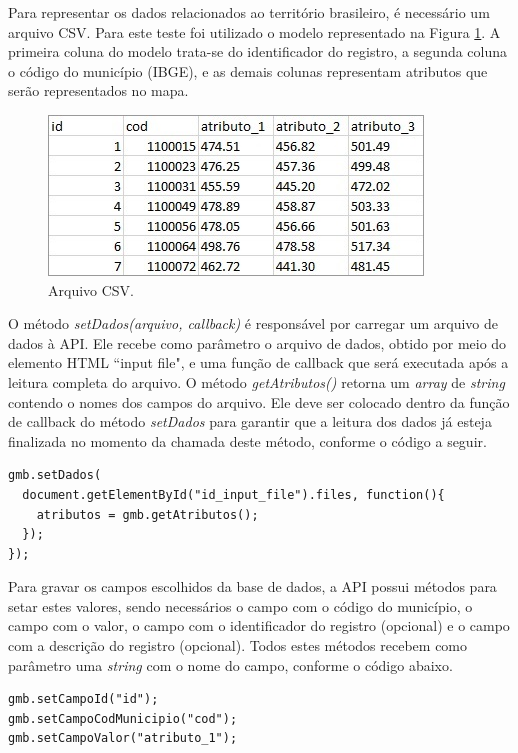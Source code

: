 \documentclass[12pt]{article}
\begin{document}
Para representar os dados relacionados ao território brasileiro, é necessário um arquivo CSV. Para este teste foi utilizado o modelo representado na Figura \ref{baseDados}. A primeira coluna do modelo trata-se do identificador do registro, a segunda coluna o código do município (IBGE), e as demais colunas representam atributos que serão representados no mapa.

\begin{figure}[!h]
\centering
\includegraphics[scale=1]{base-de-dados.jpg}
\caption{Arquivo CSV.}
\label{baseDados}
\end{figure}

O método \textit{setDados(arquivo, callback)} é responsável por carregar um arquivo de dados à API. Ele recebe como parâmetro o arquivo de dados, obtido por meio do elemento HTML ``input file", e uma função de callback que será executada após a leitura completa do arquivo. O método \textit{getAtributos()} retorna um \textit{array} de \textit{string} contendo o nomes dos campos do arquivo. Ele deve ser colocado dentro da função de callback do método \textit{setDados} para garantir que a leitura dos dados já esteja finalizada no momento da chamada deste método, conforme o código a seguir.

\begin{lstlisting}
gmb.setDados(
  document.getElementById("id_input_file").files, function(){
    atributos = gmb.getAtributos();
  });
});
\end{lstlisting}

Para gravar os campos escolhidos da base de dados, a API possui métodos para setar estes valores, sendo necessários o campo com o código do município, o campo com o valor, o campo com o identificador do registro (opcional) e o campo com a descrição do registro (opcional). Todos estes métodos recebem como parâmetro uma \textit{string} com o nome do campo, conforme o código abaixo.

\begin{lstlisting}
gmb.setCampoId("id");
gmb.setCampoCodMunicipio("cod");
gmb.setCampoValor("atributo_1");
\end{lstlisting}
\end{document}
